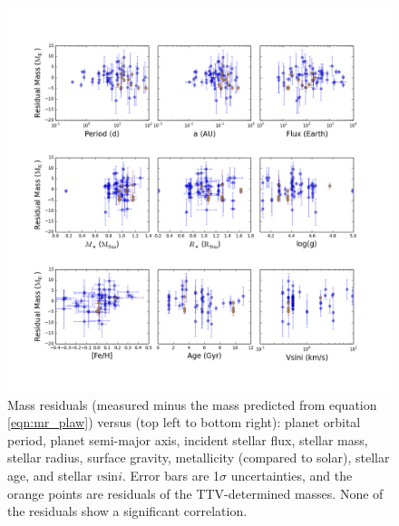\documentclass[iop]{emulateapj}
\begin{document}
\begin{figure}[htbp] %
   \centering
    \includegraphics[width=6in]{mr_resids.png} 
   \caption{\small Mass residuals (measured minus the mass predicted from equation \ref{eqn:mr_plaw}) versus (top left to bottom right): planet orbital period, planet semi-major axis, incident stellar flux, stellar mass, stellar radius, surface gravity, metallicity (compared to solar), stellar age, and stellar $v\mathrm{sin}i$. Error bars are 1$\sigma$ uncertainties, and the orange points are residuals of the TTV-determined masses.  None of the residuals show a significant correlation.}
   \label{fig:resids}
\end{figure}

\clearpage
\end{document}
